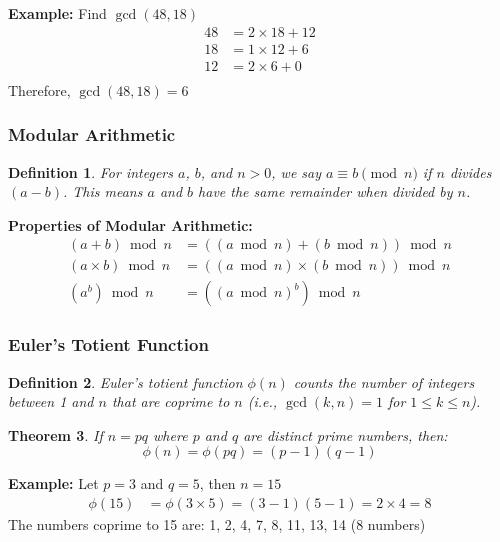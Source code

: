 \documentclass[11pt,a4paper]{article}
\newtheorem{theorem}{Theorem}[section]
\newtheorem{definition}[theorem]{Definition}
\begin{document}
\begin{examplebox}
\textbf{Example:} Find $\gcd(48, 18)$
\begin{align*}
48 &= 2 \times 18 + 12 \\
18 &= 1 \times 12 + 6 \\
12 &= 2 \times 6 + 0 \\
\end{align*}
Therefore, $\gcd(48, 18) = 6$
\end{examplebox}

\subsubsection{Modular Arithmetic}

\begin{definition}
For integers $a$, $b$, and $n > 0$, we say $a \equiv b \pmod{n}$ if $n$ divides $(a - b)$. This means $a$ and $b$ have the same remainder when divided by $n$.
\end{definition}

\begin{mathbox}
\textbf{Properties of Modular Arithmetic:}
\begin{align*}
(a + b) \bmod n &= ((a \bmod n) + (b \bmod n)) \bmod n \\
(a \times b) \bmod n &= ((a \bmod n) \times (b \bmod n)) \bmod n \\
(a^b) \bmod n &= ((a \bmod n)^b) \bmod n
\end{align*}
\end{mathbox}

\subsubsection{Euler's Totient Function}

\begin{definition}
Euler's totient function $\phi(n)$ counts the number of integers between 1 and $n$ that are coprime to $n$ (i.e., $\gcd(k,n) = 1$ for $1 \leq k \leq n$).
\end{definition}

\begin{theorem}
If $n = pq$ where $p$ and $q$ are distinct prime numbers, then:
$$\phi(n) = \phi(pq) = (p-1)(q-1)$$
\end{theorem}

\begin{examplebox}
\textbf{Example:} Let $p = 3$ and $q = 5$, then $n = 15$
\begin{align*}
\phi(15) &= \phi(3 \times 5) = (3-1)(5-1) = 2 \times 4 = 8
\end{align*}
The numbers coprime to 15 are: 1, 2, 4, 7, 8, 11, 13, 14 (8 numbers)
\end{examplebox}
\end{document}
